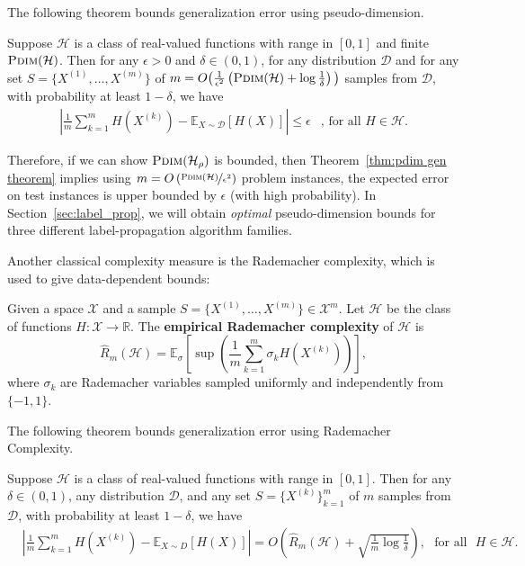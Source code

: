 \noindent The following theorem bounds generalization error using pseudo-dimension.

\begin{theorem}\citep{AnthonyBartlett2009}
\label{thm:pdim gen theorem}
    Suppose $\mathcal{H}$ is a class of real-valued functions with range in $[0, 1]$ and finite $\textsc{Pdim}(\mathcal{H})$. Then for any $\epsilon > 0$ and $\delta \in (0,1)$, for any distribution $\mathcal{D}$ and for any set $S = \{X^{(1)}, \ldots, X^{(m)}\}$ of $m = O\big( \frac{1}{\epsilon^2}\left(\textsc{Pdim}(\mathcal{H}) + \log \frac{1}{\delta}\right)\big)$ samples from $\mathcal{D}$, with probability at least $1-\delta$, we have 
    \begin{align*}
        \left|\frac{1}{m}\sum_{k=1}^mH({X^{(k)}}) - \mathbb{E}_{X \sim \mathcal{D}}[H(X)]\right| \le \epsilon & \text{,  for all $H \in \mathcal{H}$}.
    \end{align*}
\end{theorem}

\noindent Therefore, if we can show $\textsc{Pdim}(\mathcal{H}_\rho)$ is bounded, then %
Theorem~\ref{thm:pdim gen theorem} implies using $m = O\left(\nicefrac{\textsc{Pdim}(\mathcal{H})}{\epsilon^2}\right)$ problem instances, the expected error on test instances is upper bounded by $\epsilon$ (with high probability). In Section~\ref{sec:label_prop}, we will obtain \emph{optimal} pseudo-dimension bounds for three different label-propagation algorithm families.

Another classical complexity measure is the Rademacher complexity, which is used to give data-dependent bounds:
\begin{definition}
    Given a space $\mathcal{X}$ and a %
    sample $S = \{X^{(1)}, \ldots, X^{(m)}\}\in \mathcal{X}^m$. %
    Let $\mathcal{H}$ be the class of functions $H: \mathcal{X} \rightarrow \mathbb{R}$. The \textbf{empirical Rademacher complexity} of $\mathcal{H}$ is 
    \[\hat R_m(\mathcal{H}) = \mathbb{E}_\sigma \left[\sup \left(\frac{1}{m}\sum_{k=1}^m \sigma_k H(X^{(k)})\right)\right],\]
    where  $\sigma_k$ are Rademacher variables %
    sampled uniformly and independently from $\{-1, 1\}$. 
\end{definition}

\noindent The following theorem bounds generalization error using Rademacher Complexity.
\begin{theorem}\citep{MohriRostamizadehTalwalkar2012}
\label{thm:rc gen}
    Suppose $\mathcal{H}$ is a class of real-valued functions with range in $[0, 1]$. Then for any $\delta \in (0,1)$, any distribution $\mathcal{D}$, and any set $S = \{X^{(k)}\}_{k=1}^m$ of $m$ samples from $\mathcal{D}$, with probability at least $1-\delta$, we have
    \begin{align*}
        &\left|\frac{1}{m}\sum_{k=1}^m H({X^{(k)}}) - \mathbb{E}_{X \sim D}[H(X)]\right|
        =  O\left( \hat R_m(\mathcal{H}) + \sqrt{\frac{1}{m} \log \frac{1}{\delta}}\right), ~~~\text{for all}~~~ H \in \mathcal{H}.
    \end{align*}
\end{theorem}


